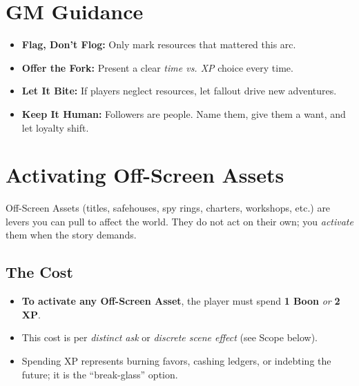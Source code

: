 \documentclass[12pt]{article}
\begin{document}
\section{GM Guidance}
\begin{itemize}
  \item \textbf{Flag, Don’t Flog:} Only mark resources that mattered this arc.
  \item \textbf{Offer the Fork:} Present a clear \emph{time vs. XP} choice every time.
  \item \textbf{Let It Bite:} If players neglect resources, let fallout drive new adventures.
  \item \textbf{Keep It Human:} Followers are people. Name them, give them a want, and let loyalty shift.
\end{itemize}

\section{Activating Off-Screen Assets}
\label{sec:asset-activation}

Off-Screen Assets (titles, safehouses, spy rings, charters, workshops, etc.) are levers you can pull to affect the world. They do not act on their own; you \emph{activate} them when the story demands.

\subsection*{The Cost}
\begin{itemize}
  \item \textbf{To activate any Off-Screen Asset}, the player must spend \textbf{1 Boon} \emph{or} \textbf{2 XP}.
  \item This cost is per \emph{distinct ask} or \emph{discrete scene effect} (see Scope below).
  \item Spending XP represents burning favors, cashing ledgers, or indebting the future; it is the ``break-glass'' option.
\end{itemize}
\end{document}
